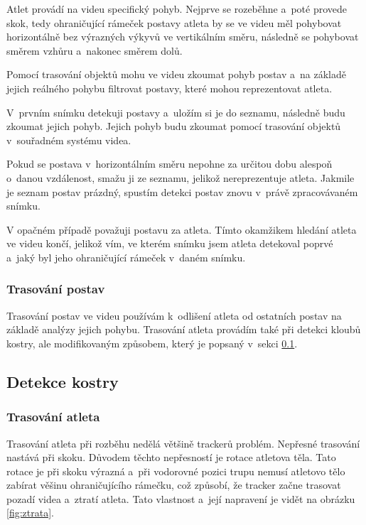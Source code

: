 Atlet provádí na videu specifický pohyb. Nejprve se rozeběhne a~poté provede skok, tedy ohraničující rámeček postavy atleta by se ve videu měl pohybovat horizontálně bez výrazných výkyvů ve vertikálním směru, následně se pohybovat směrem vzhůru a~nakonec směrem dolů.

Pomocí trasování objektů mohu ve videu zkoumat pohyb postav a~na základě jejich reálného pohybu filtrovat postavy, které mohou reprezentovat atleta.

V~prvním snímku detekuji postavy a~uložím si je do seznamu, následně budu zkoumat jejich pohyb. Jejich pohyb budu zkoumat pomocí trasování objektů v~souřadném systému videa.

Pokud se postava v~horizontálním směru nepohne za určitou dobu alespoň o~danou vzdálenost, smažu ji ze seznamu, jelikož nereprezentuje atleta. Jakmile je seznam postav prázdný, spustím detekci postav znovu v~právě zpracovávaném snímku.

V opačném případě považuji postavu za atleta. Tímto okamžikem hledání atleta ve videu končí, jelikož vím, ve kterém snímku jsem atleta detekoval poprvé a~jaký byl jeho ohraničující rámeček v~daném snímku.


\subsubsection{Trasování postav}

Trasování postav ve videu používám k~odlišení atleta od ostatních postav na základě analýzy jejich pohybu. Trasování atleta provádím také při detekci kloubů kostry, ale modifikovaným způsobem, který je popsaný v~sekci \ref{ssec:ndetekce}.



\subsection{Detekce kostry}
\label{ssec:ndetekce}

\subsubsection{Trasování atleta}

Trasování atleta při rozběhu nedělá většině trackerů problém. Nepřesné trasování nastává při skoku. Důvodem těchto nepřesností je rotace atletova těla. Tato rotace je při skoku výrazná a~při vodorovné pozici trupu nemusí atletovo tělo zabírat věšinu ohraničujícího rámečku, což způsobí, že tracker začne trasovat pozadí videa a~ztratí atleta. Tato vlastnost a~její napravení je vidět na obrázku \ref{fig:ztrata}.

